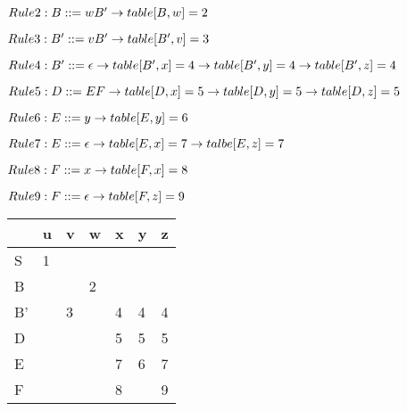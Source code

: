 \documentclass[a4paper, 12pt]{article}
\begin{document}
            $Rule 2: B::= wB'\\
            \rightarrow table[B,w] = 2$
            
            $Rule 3: B'::= vB'\\
            \rightarrow table[B',v] = 3$
            
            $Rule 4: B'::= \epsilon\\
            \rightarrow table[B',x] = 4\\
            \rightarrow table[B',y] = 4\\
            \rightarrow table[B',z] = 4$
            
            $Rule 5: D::= EF\\
            \rightarrow table[D,x] = 5\\
            \rightarrow table[D,y] = 5\\
            \rightarrow table[D,z] = 5$
            
            $Rule 6: E::= y\\
            \rightarrow table[E,y] = 6$
            
            $Rule 7: E::= \epsilon\\
            \rightarrow table[E,x] = 7\\
            \rightarrow talbe[E,z] = 7$
            
            $Rule 8: F::= x\\
            \rightarrow table[F,x] = 8$
            
            $Rule 9: F::= \epsilon\\
            \rightarrow table[F,z] = 9$
            
            \begin{tabular}{ p{2cm} | p{2cm} | p{2cm} | p{2cm} | p{2cm} | p{2cm} | p{2cm}}
                \hline
                & u & v & w & x & y & z \\ \hline                        
                S & 1 & & & & & \\ \hline
                B & & & 2 & & & \\ \hline
                B' & & 3 & & 4 & 4 & 4 \\ \hline
                D & & & & 5 & 5 & 5 \\ \hline
                E & & & & 7 & 6 & 7 \\ \hline
                F & & & & 8 & & 9 \\
                \hline
            \end{tabular}
        
\end{document}
